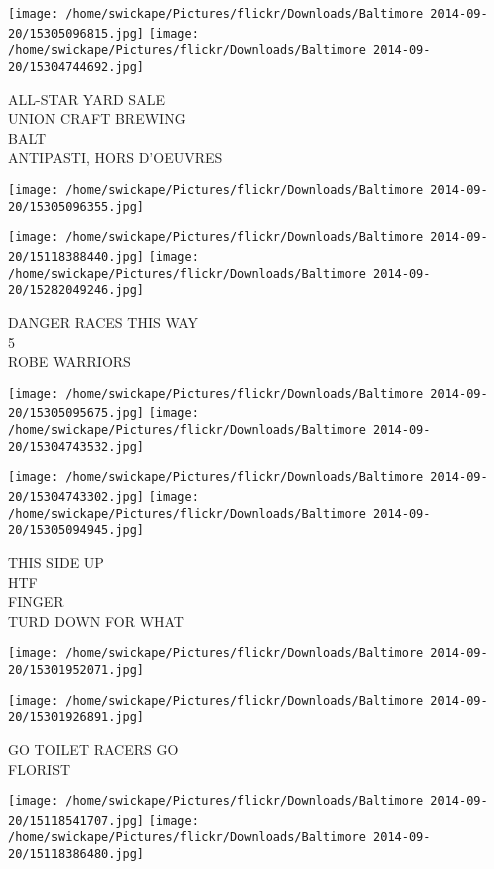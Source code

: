 \documentclass[10pt,letterpaper]{article}
\begin{document}
\texttt{[image: /home/swickape/Pictures/flickr/Downloads/Baltimore 2014-09-20/15305096815.jpg]}
\texttt{[image: /home/swickape/Pictures/flickr/Downloads/Baltimore 2014-09-20/15304744692.jpg]}

ALL{-}STAR YARD SALE\\
UNION CRAFT BREWING\\
BALT\\
ANTIPASTI, HORS D'OEUVRES
\pagebreak

\texttt{[image: /home/swickape/Pictures/flickr/Downloads/Baltimore 2014-09-20/15305096355.jpg]}

\vspace{0.25in}
\texttt{[image: /home/swickape/Pictures/flickr/Downloads/Baltimore 2014-09-20/15118388440.jpg]}
\texttt{[image: /home/swickape/Pictures/flickr/Downloads/Baltimore 2014-09-20/15282049246.jpg]}

DANGER RACES THIS WAY\\
5\\
ROBE WARRIORS
\pagebreak

\texttt{[image: /home/swickape/Pictures/flickr/Downloads/Baltimore 2014-09-20/15305095675.jpg]}
\texttt{[image: /home/swickape/Pictures/flickr/Downloads/Baltimore 2014-09-20/15304743532.jpg]}

\texttt{[image: /home/swickape/Pictures/flickr/Downloads/Baltimore 2014-09-20/15304743302.jpg]}
\texttt{[image: /home/swickape/Pictures/flickr/Downloads/Baltimore 2014-09-20/15305094945.jpg]}

THIS SIDE UP\\
HTF\\
FINGER\\
TURD DOWN FOR WHAT
\pagebreak

\texttt{[image: /home/swickape/Pictures/flickr/Downloads/Baltimore 2014-09-20/15301952071.jpg]}

\vspace{0.25in}
\texttt{[image: /home/swickape/Pictures/flickr/Downloads/Baltimore 2014-09-20/15301926891.jpg]}

GO TOILET RACERS GO\\
FLORIST
\pagebreak

\texttt{[image: /home/swickape/Pictures/flickr/Downloads/Baltimore 2014-09-20/15118541707.jpg]}
\texttt{[image: /home/swickape/Pictures/flickr/Downloads/Baltimore 2014-09-20/15118386480.jpg]}
\end{document}

